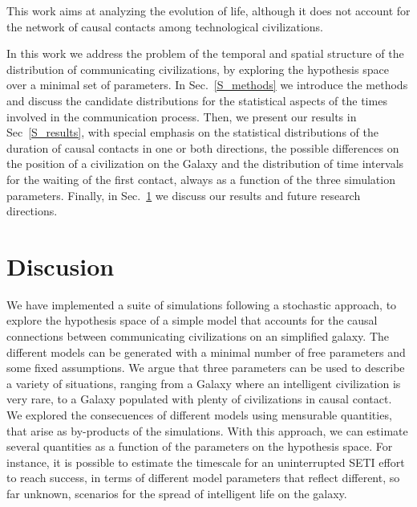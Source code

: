 \documentclass[crop]{CSLB}
\begin{document}
This work aims at analyzing the evolution of life, although it does
not account for the network of causal contacts among technological
civilizations.


In this work we address the problem of the temporal and spatial
structure of the distribution of communicating civilizations, by
exploring the hypothesis space over a minimal set of parameters.
%
In Sec.~\ref{S_methods} we introduce the methods and discuss the
candidate distributions for the statistical aspects of the times
involved in the communication process.
%
Then, we present our results in Sec~\ref{S_results}, with special
emphasis on the statistical distributions of the duration of causal
contacts in one or both directions, the possible differences on the
position of a civilization on the Galaxy and the distribution of time
intervals for the waiting of the first contact, always as a function
of the three simulation parameters.
%
Finally, in Sec.~\ref{S_discussion} we discuss our results and future
research directions.





                      



\section{Discusion}\label{S_discussion}

We have implemented a suite of simulations following a stochastic
approach, to explore the hypothesis space of a simple model that
accounts for the causal connections between communicating
civilizations on an simplified galaxy.
%
The different models can be generated with a minimal number of free
parameters and some fixed assumptions.
%
We argue that three parameters can be used to describe a variety of
situations, ranging from a Galaxy where an intelligent civilization is
very rare, to a Galaxy populated with plenty of civilizations in
causal contact.
%
We explored the consecuences of different models using mensurable
quantities, that arise as by-products of the simulations.
%
With this approach, we can estimate several quantities as a function
of the parameters on the hypothesis space.
%
For instance, it is possible to estimate the timescale for an
uninterrupted SETI effort to reach success, in terms of different
model parameters that reflect different, so far unknown, scenarios for
the spread of intelligent life on the galaxy.
\end{document}
